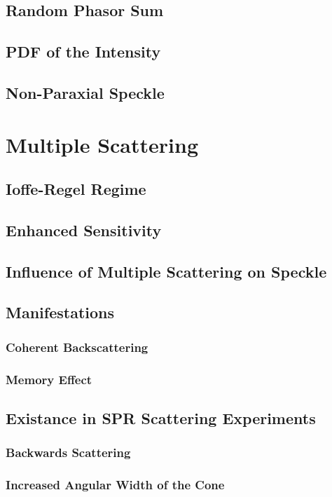 \documentclass[a4paper,titlepage,onecolumn]{report}
\begin{document}
  \subsection{Random Phasor Sum}
  \subsection{PDF of the Intensity}
  \subsection{Non-Paraxial Speckle}
 \section{Multiple Scattering}
  \subsection{Ioffe-Regel Regime}
  \subsection{Enhanced Sensitivity}
  \subsection{Influence of Multiple Scattering on Speckle}
  \subsection{Manifestations}
   \subsubsection{Coherent Backscattering}
   \subsubsection{Memory Effect}
  \subsection{Existance in SPR Scattering Experiments}
   \subsubsection{Backwards Scattering}
   \subsubsection{Increased Angular Width of the Cone}
\end{document}

